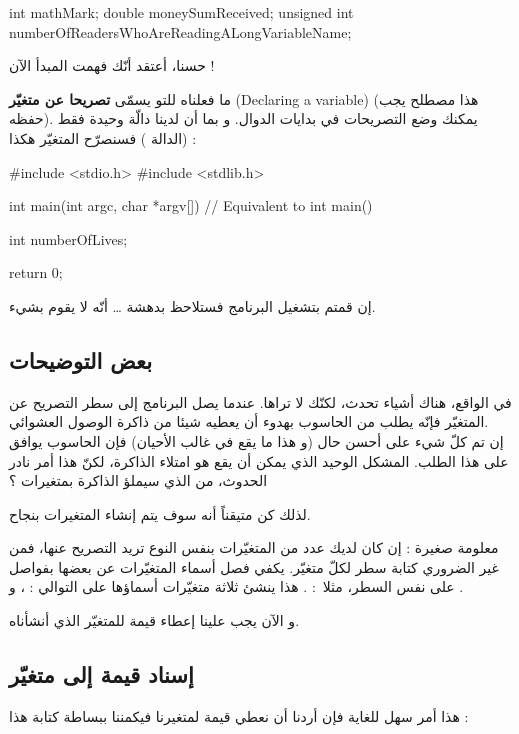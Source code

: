 \begin{Csource}
int mathMark;
double moneySumReceived;
unsigned int numberOfReadersWhoAreReadingALongVariableName;
\end{Csource}

حسنا، أعتقد أنّك فهمت المبدأ الآن !

ما فعلناه للتو يسمّى
\textbf{تصريحا عن متغيّر}
(\textenglish{Declaring a variable})
(هذا مصطلح يجب حفظه). يمكنك وضع التصريحات في بدايات الدوال. و بما أن لدينا دالّة وحيدة فقط
(الدالة
)
فسنصرّح المتغيّر هكذا :

\begin{Csource}
#include <stdio.h>
#include <stdlib.h>

int main(int argc, char *argv[]) // Equivalent to int main()
{
  int numberOfLives;

  return 0;
}
\end{Csource}

إن قمتم بتشغيل البرنامج فستلاحظ بدهشة 
\dots
أنّه لا يقوم بشيء.

\subsection{بعض التوضيحات}

في الواقع، هناك أشياء تحدث، لكنّك لا تراها. عندما يصل البرنامج إلى سطر التصريح عن المتغيّر فإنّه يطلب من الحاسوب بهدوء أن يعطيه شيئا من ذاكرة الوصول العشوائي.\\
إن تم كلّ شيء على أحسن حال (و هذا ما يقع في غالب الأحيان) فإن الحاسوب يوافق على هذا الطلب.
المشكل الوحيد الذي يمكن أن يقع هو امتلاء الذاكرة، لكنّ هذا أمر نادر الحدوث، من الذي سيملؤ الذاكرة بمتغيرات
 ؟

لذلك كن متيقناً أنه سوف يتم إنشاء المتغيرات بنجاح.

\begin{information}
  معلومة صغيرة : إن كان لديك عدد من المتغيّرات بنفس النوع تريد التصريح عنها، فمن غير الضروري كتابة سطر لكلّ متغيّر. يكفي فصل أسماء المتغيّرات عن بعضها بفواصل على نفس السطر، مثلا~:
.
هذا ينشئ ثلاثة متغيّرات أسماؤها على التوالي :
، 
و
.
\end{information}

و الآن يجب علينا إعطاء قيمة للمتغيّر الذي أنشأناه.

\subsection{إسناد قيمة إلى متغيّر}
هذا أمر سهل للغاية فإن أردنا أن نعطي قيمة لمتغيرنا
فيكمننا ببساطة كتابة هذا :

